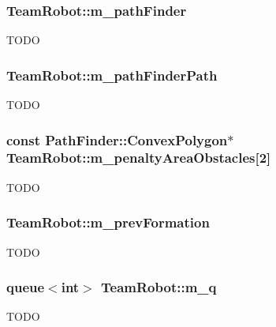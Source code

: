 \hypertarget{classTeamRobot_ac5845718f0d540e3f17f39d62d6f11c7}{
\subsubsection[{m\_\-pathFinder}]{ {\bf TeamRobot::m\_\-pathFinder}}}
\label{classTeamRobot_ac5845718f0d540e3f17f39d62d6f11c7}
TODO \hypertarget{classTeamRobot_aca22e17bd02f1ce84786ed2194764afa}{
\subsubsection[{m\_\-pathFinderPath}]{ {\bf TeamRobot::m\_\-pathFinderPath}}}
\label{classTeamRobot_aca22e17bd02f1ce84786ed2194764afa}
TODO \hypertarget{classTeamRobot_a155fbee5f74459799332801b09c99616}{
\subsubsection[{m\_\-penaltyAreaObstacles}]{\setlength{\rightskip}{0pt plus 5cm}const {\bf PathFinder::ConvexPolygon}$\ast$ {\bf TeamRobot::m\_\-penaltyAreaObstacles}\mbox{[}2\mbox{]}}}
\label{classTeamRobot_a155fbee5f74459799332801b09c99616}
TODO \hypertarget{classTeamRobot_ab32d14c3de4fd5a6ff6db39eb04f52f2}{
\subsubsection[{m\_\-prevFormation}]{ {\bf TeamRobot::m\_\-prevFormation}}}
\label{classTeamRobot_ab32d14c3de4fd5a6ff6db39eb04f52f2}
TODO \hypertarget{classTeamRobot_a982ed6b6964c5e8b94519ef91b52c468}{
\subsubsection[{m\_\-q}]{\setlength{\rightskip}{0pt plus 5cm}queue$<$int$>$ {\bf TeamRobot::m\_\-q}}}
\label{classTeamRobot_a982ed6b6964c5e8b94519ef91b52c468}
TODO 

